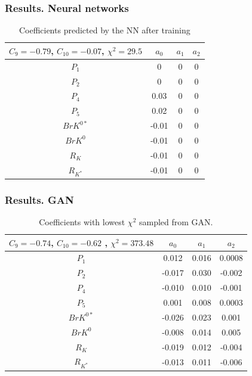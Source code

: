 \documentclass{beamer}
\begin{document}
\begin{frame}

\frametitle{Results. Neural networks}

	\begin{table}
		\begin{tabular}{ |c|c|c|c|  } 
			\hline
			\small
			\(C_9 = -0.79\), \(C_{10} = -0.07\),  \(\chi^2 = 29.5 \)\normalsize
			& \textbf{\(a_0\)} & \textbf{\(a_1\)} & \textbf{\(a_2\)}\\
			\hline
			\(P_1\) & 0 & 0 &  0 \\
			\hline
			\(P_2\) & 0 & 0 & 0 \\	
			\hline
			\(P_4\) & 0.03 & 0 &	0 \\
			\hline
			\(P_5\) & 0.02 &   0 &   0 \\		
			\hline
			\(BrK^{0*}\) & -0.01 & 0 & 0 \\		
			\hline
			\(BrK^{0}\) & -0.01 & 0 & 0 \\		
			\hline	
			\(R_{K}\) & -0.01 & 0 & 0 \\
			\hline	
			\(R_{K^*}\) & -0.01 & 0 & 0 \\		
			\hline
		\end{tabular}
		\caption{\label{tab:NNExp2NNPrediction} Coefficients predicted by the NN after training}
	\end{table}
\end{frame}
\begin{frame}
\frametitle{Results. GAN}
\begin{table}
	\begin{tabular}{ |c|c|c|c|  } 
		\hline
		\small
		\(C_9 = -0.74\), \(C_{10} = -0.62\) ,  \(\chi^2 = 373.48 \)
		\normalsize
		& \textbf{\(a_0\)} & \textbf{\(a_1\)} & \textbf{\(a_2\)}\\
		\hline
		\(P_1\) & 0.012 & 0.016 &  0.0008 \\
		\hline
		\(P_2\) & -0.017 & 0.030 & -0.002 \\	
		\hline
		\(P_4\) & -0.010 & 0.010 &	-0.001 \\
		\hline
		\(P_5\) & 0.001 &  0.008 &   0.0003 \\		
		\hline
		\(BrK^{0*}\) & -0.026 & 0.023 & 0.001 \\		
		\hline
		\(BrK^{0}\) & -0.008 & 0.014 & 0.005 \\		
		\hline	
		\(R_{K}\) & -0.019 & 0.012 & -0.004 \\
		\hline	
		\(R_{K^*}\) & -0.013 & 0.011 & -0.006 \\		
		\hline
		
		
	\end{tabular}
	\caption{\label{tab:GAN3Results} Coefficients with lowest \(\chi^2 \) sampled from GAN. }
\end{table}
\end{frame}
\end{document}
